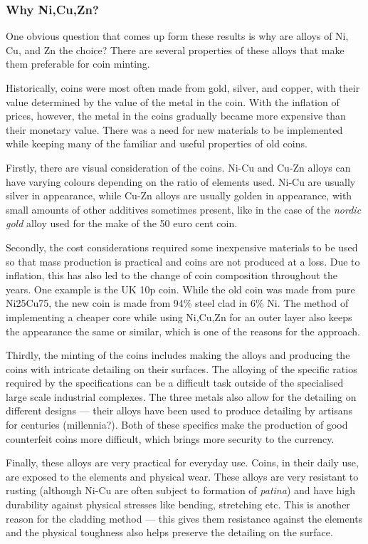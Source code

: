 \documentclass[11pt,a4paper,twoside,onecolumn]{article}
\begin{document}
\subsubsection{Why Ni,Cu,Zn?}
One obvious question that comes up form these results is why are alloys of Ni, Cu, and Zn the choice? There are several properties of these alloys that make them preferable for coin minting.

Historically, coins were most often made from gold, silver, and copper, with their value determined by the value of the metal in the coin. With the inflation of prices, however, the metal in the coins gradually became more expensive than their monetary value. There was a need for new materials to be implemented while keeping many of the familiar and useful properties of old coins.

Firstly, there are visual consideration of the coins. Ni-Cu and Cu-Zn alloys can have varying colours depending on the ratio of elements used. Ni-Cu are usually silver in appearance, while Cu-Zn alloys are usually golden in appearance, with small amounts of other additives sometimes present, like in the case of the \emph{nordic gold} alloy used for the make of the 50 euro cent coin.

Secondly, the cost considerations required some inexpensive materials to be used so that mass production is practical and coins are not produced at a loss. Due to inflation, this has also led to the change of coin composition throughout the years. One example is the UK 10p coin. While the old coin was made from pure Ni25Cu75, the new coin is made from 94\% steel clad in 6\% Ni. The method of implementing a cheaper core while using Ni,Cu,Zn for an outer layer also keeps the appearance the same or similar, which is one of the reasons for the approach.

Thirdly, the minting of the coins includes making the alloys and producing the coins with intricate detailing on their surfaces. The alloying of the specific ratios required by the specifications can be a difficult task outside of the specialised large scale industrial complexes. The three metals also allow for the detailing on different designs --- their alloys have been used to produce detailing by artisans for centuries (millennia?). Both of these specifics make the production of good counterfeit coins more difficult, which brings more security to the currency.

Finally, these alloys are very practical for everyday use. Coins, in their daily use, are exposed to the elements and physical wear. These alloys are very resistant to rusting (although Ni-Cu are often subject to formation of \emph{patina}) and have high durability against physical stresses like bending, stretching etc. This is another reason for the cladding method --- this gives them resistance against the elements and the physical toughness also helps preserve the detailing on the surface.
\end{document}
